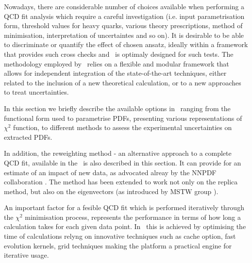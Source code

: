



Nowadays, there are considerable number of choices available when performing a QCD fit analysis which require a careful investigation (i.e. input parametrisation form, threshold values for heavy quarks, various theory prescriptions, method of minimisation, interpretation of uncertaintes and so on).
%
 It is desirable to be able to discriminate or quantify the effect of chosen ansatz,  ideally within a framework that provides such cross checks and 
\fitter\ is optimaly designed for such tests.
%
The methodology employed by \fitter\  relies on a flexible and modular
framework that allows for independent integration of the state-of-the-art techniques, either related to the inclusion of a new theoretical calculation, or to a new approaches to treat uncertainties. 
%

In this section we briefly describe the available options in \fitter\ ranging from the functional form used to parametrise PDFs, presenting various representations of $\chi^2$ function, to different methods to assess the experimental uncertainties on extracted PDFs.

In addition, the reweighting method - an alternative approach to a complete QCD fit, available in the \fitter\ is also described in this section. It can provide for an estimate of an impact of new data, as advocated 
alreay by the NNPDF collaboration \cite{Ball:2011gg,Ball:2010gb}.
The method has been extended to work not only on the replica method, 
but also on the eigenvectors (as introduced by MSTW group \cite{Watt:2012tq}).

An important factor for a fesible QCD fit which is performed iteratively through the $\chi^2$ minimisation process,  represents the performance in terms of how long a calculation takes for each given data point.
In \fitter\ this is achieved by optimising the time of calculations relyng on innovative techniques such as cache option, fast evolution kernels, grid techniques making the platform a practical engine for iterative usage.


